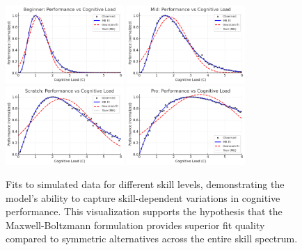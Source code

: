 \documentclass{article}
\begin{document}
\begin{figure}[h]
    \centering
    \includegraphics[width=0.4\textwidth]{figures/simulation-begin.png}
    \includegraphics[width=0.4\textwidth]{figures/simulation-mid.png}
    \includegraphics[width=0.4\textwidth]{figures/simulation-scratch.png}
    \includegraphics[width=0.4\textwidth]{figures/simulation-pro.png}
    \caption{Fits to simulated data for different skill levels, demonstrating the model's ability to capture 
skill-dependent variations in cognitive performance. This visualization supports the hypothesis that the 
Maxwell-Boltzmann formulation provides superior fit quality compared to symmetric alternatives across the 
entire skill spectrum.}
    \label{fig:simfits}
\end{figure}
\end{document}

